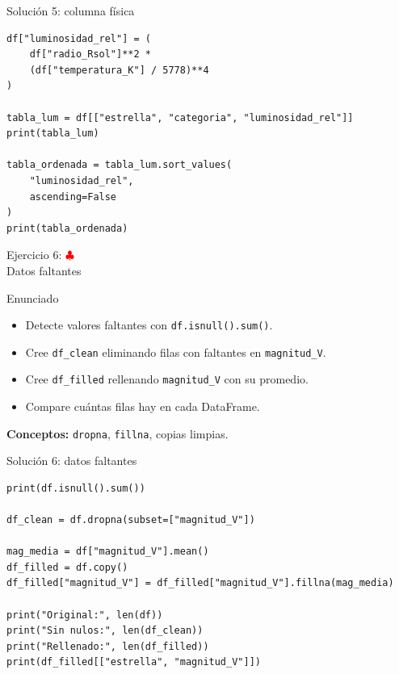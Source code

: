 \documentclass[10pt]{beamer}
\begin{document}
\begin{solutionblock}
\begin{frame}[fragile,shrink=5]{Solución 5: columna física}
\begin{verbatim}
df["luminosidad_rel"] = (
    df["radio_Rsol"]**2 *
    (df["temperatura_K"] / 5778)**4
)

tabla_lum = df[["estrella", "categoria", "luminosidad_rel"]]
print(tabla_lum)

tabla_ordenada = tabla_lum.sort_values(
    "luminosidad_rel",
    ascending=False
)
print(tabla_ordenada)
\end{verbatim}
\end{frame}
\end{solutionblock}

\begin{frame}{Ejercicio 6: \hfill \textcolor{red}{$\clubsuit$} \\ Datos faltantes}
  \begin{block}{Enunciado}
    \begin{itemize}
      \item Detecte valores faltantes con \texttt{df.isnull().sum()}.
      \item Cree \texttt{df\_clean} eliminando filas con faltantes en \texttt{magnitud\_V}.
      \item Cree \texttt{df\_filled} rellenando \texttt{magnitud\_V} con su promedio.
      \item Compare cuántas filas hay en cada DataFrame.
    \end{itemize}
  \end{block}
  \textbf{Conceptos:} \texttt{dropna}, \texttt{fillna}, copias limpias.
\end{frame}

\begin{solutionblock}
\begin{frame}[fragile,shrink=5]{Solución 6: datos faltantes}
\begin{verbatim}
print(df.isnull().sum())

df_clean = df.dropna(subset=["magnitud_V"])

mag_media = df["magnitud_V"].mean()
df_filled = df.copy()
df_filled["magnitud_V"] = df_filled["magnitud_V"].fillna(mag_media)

print("Original:", len(df))
print("Sin nulos:", len(df_clean))
print("Rellenado:", len(df_filled))
print(df_filled[["estrella", "magnitud_V"]])
\end{verbatim}
\end{frame}
\end{solutionblock}
\end{document}
